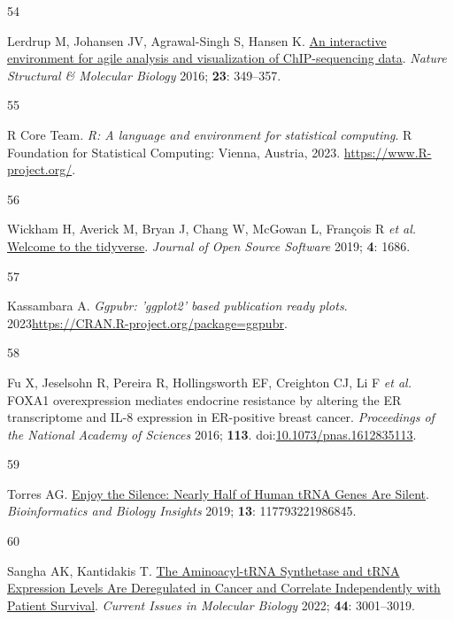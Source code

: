 \documentclass[
  12pt,
]{article}
\newlength{\cslhangindent}
\newlength{\csllabelwidth}
\newlength{\cslentryspacingunit} %
\newenvironment{CSLReferences}[2] %
 {%
  \setlength{\parindent}{0pt}
  \ifodd #1
  \let\oldpar\par
  \def\par{\hangindent=\cslhangindent\oldpar}
  \fi
  \setlength{\parskip}{#2\cslentryspacingunit}
 }%
 {}
\newcommand{\CSLLeftMargin}[1]{\parbox[t]{\csllabelwidth}{#1}}
\newcommand{\CSLRightInline}[1]{\parbox[t]{\linewidth - \csllabelwidth}{#1}\break}
\begin{document}
\begin{CSLReferences}{0}{0}
\leavevmode{}%
\CSLLeftMargin{54 }%
\CSLRightInline{Lerdrup M, Johansen JV, Agrawal-Singh S, Hansen K. \href{https://doi.org/10.1038/nsmb.3180}{An interactive environment for agile analysis and visualization of ChIP-sequencing data}. \emph{Nature Structural \& Molecular Biology} 2016; \textbf{23}: 349--357.}

\leavevmode{}%
\CSLLeftMargin{55 }%
\CSLRightInline{R Core Team. \emph{R: A language and environment for statistical computing}. R Foundation for Statistical Computing: Vienna, Austria, 2023. \url{https://www.R-project.org/}.}

\leavevmode{}%
\CSLLeftMargin{56 }%
\CSLRightInline{Wickham H, Averick M, Bryan J, Chang W, McGowan L, François R \emph{et al.} \href{https://doi.org/10.21105/joss.01686}{Welcome to the tidyverse}. \emph{Journal of Open Source Software} 2019; \textbf{4}: 1686.}

\leavevmode{}%
\CSLLeftMargin{57 }%
\CSLRightInline{Kassambara A. \emph{Ggpubr: 'ggplot2' based publication ready plots}. 2023\url{https://CRAN.R-project.org/package=ggpubr}.}

\leavevmode{}%
\CSLLeftMargin{58 }%
\CSLRightInline{Fu X, Jeselsohn R, Pereira R, Hollingsworth EF, Creighton CJ, Li F \emph{et al.} FOXA1 overexpression mediates endocrine resistance by altering the ER transcriptome and IL-8 expression in ER-positive breast cancer. \emph{Proceedings of the National Academy of Sciences} 2016; \textbf{113}. doi:\href{https://doi.org/10.1073/pnas.1612835113}{10.1073/pnas.1612835113}.}

\leavevmode{}%
\CSLLeftMargin{59 }%
\CSLRightInline{Torres AG. \href{https://doi.org/10.1177/1177932219868454}{Enjoy the Silence: Nearly Half of Human tRNA Genes Are Silent}. \emph{Bioinformatics and Biology Insights} 2019; \textbf{13}: 117793221986845.}

\leavevmode{}%
\CSLLeftMargin{60 }%
\CSLRightInline{Sangha AK, Kantidakis T. \href{https://doi.org/10.3390/cimb44070207}{The Aminoacyl-tRNA Synthetase and tRNA Expression Levels Are Deregulated in Cancer and Correlate Independently with Patient Survival}. \emph{Current Issues in Molecular Biology} 2022; \textbf{44}: 3001--3019.}

\end{CSLReferences}
\end{document}
